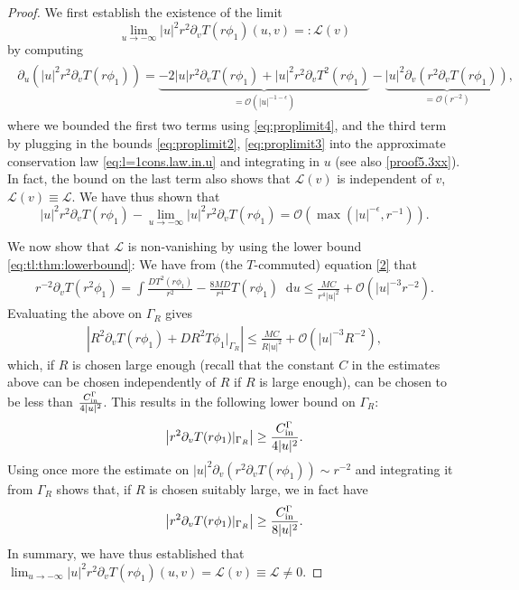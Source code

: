 \documentclass[11pt,english]{article}
\numberwithin{equation}{section}
\theoremstyle{remark}
\theoremstyle{plain}
\theoremstyle{remark}
\newcommand{\dd}{\mathop{}\!\mathrm{d}}
\newcommand{\pu}{\partial_u}
\newcommand{\pv}{\partial_v}
\renewcommand{\(}{\left(}
\renewcommand{\)}{\right)}
\begin{document}
\begin{proof}
We first establish the existence of the limit
\begin{equation}
\lim_{u\to-\infty}|u|^2 r^2\pv T(r\phi_1)(u,v)=:\mathcal{L}(v)
\end{equation}
by computing 
\begin{align}\label{eq:tl:limdifference}
\begin{split}
\pu(|u|^2 r^2\pv T(r\phi_1))
=\underbrace{-2|u|r^2\pv T(r\phi_1)+|u|^2r^2\pv T^2(r\phi_1)}_{=\mathcal{O}(|u|^{-1-\epsilon})}-\underbrace{|u|^2\pv(r^2\pv T(r\phi_1))}_{=\mathcal{O}(r^{-2})},
\end{split}
\end{align}
where we bounded the first two terms using \eqref{eq:proplimit4}, and the third term by plugging in the bounds \eqref{eq:proplimit2}, \eqref{eq:proplimit3} into the approximate conservation law \eqref{eq:l=1cons.law.in.u} and integrating in $u$ (see also \eqref{proof5.3xx}). 
In fact, the bound on the last term also shows that $\mathcal{L}(v)$ is independent of $v$, $\mathcal L(v)\equiv \mathcal L$.  We have thus shown that
\begin{equation}
|u|^2 r^2\pv T(r\phi_1)-\lim_{u\to-\infty}|u|^2 r^2\pv T(r\phi_1)=\mathcal{O}(\max(|u|^{-\epsilon},r^{-1})).
\end{equation}

We now show that $\mathcal{L}$ is non-vanishing by using the lower bound \eqref{eq:tl:thm:lowerbound}: We have from (the $T$-commuted) equation \eqref{2} that
\begin{align*}
r^{-2}\pv T(r^2\phi_1)=\int \frac{D T^2(r\phi_1)}{r^2}-\frac{8MD}{r^4}T(r\phi_1)\dd u
		\leq \frac{MC}{r^4|u|^2}+\mathcal{O}(|u|^{-3}r^{-2}).
\end{align*}
Evaluating the above on $\Gamma_R$ gives
\begin{align*}
\left|R^2\pv T(r\phi_1)+D R^2 T\phi_1|_{\Gamma_R}\right|\leq \frac{MC}{R|u|^2}+\mathcal{O}(|u|^{-3}R^{-2}),
\end{align*}
which, if $R$ is chosen large enough (recall that the constant $C$ in the estimates above can be chosen independently of $R$ if $R$ is large enough), can be chosen to be less than $\frac{C_{\mathrm{in}}^\Gamma}{4|u|^2}$. This results in the following lower bound on $\Gamma_R$:
\begin{align}
\left|r^2\pv T(r\phi_1)|_{\Gamma_R}\right|\geq \frac{\cin}{4|u|^2}.
\end{align}
Using once more the estimate on $|u|^2\pv(r^2\pv T(r\phi_1))\sim r^{-2}$ and integrating it from $\Gamma_R$ shows that, if $R$ is chosen suitably large, we in fact have
\begin{align}
\left|r^2\pv T(r\phi_1)|_{\Gamma_R}\right|\geq \frac{\cin}{8|u|^2}.
\end{align}
In summary, we have thus established that
$
\lim_{u\to-\infty}|u|^2 r^2\pv T(r\phi_1)(u,v)=\mathcal{L}(v)\equiv \mathcal{L}\neq 0.
$


\end{proof}
\end{document}
